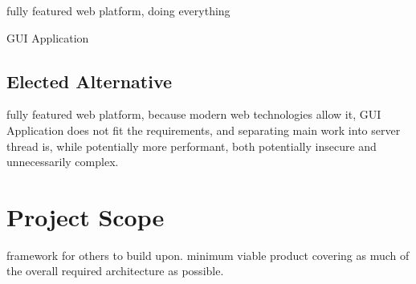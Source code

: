 fully featured web platform, doing everything

GUI Application
\subsection{Elected Alternative}
fully featured web platform, because modern web technologies allow it, GUI Application does not fit the requirements, and separating main work into server thread is, while potentially more performant, both potentially insecure and unnecessarily complex.
\section{Project Scope}
framework for others to build upon. minimum viable product covering as much of the overall required architecture as possible.